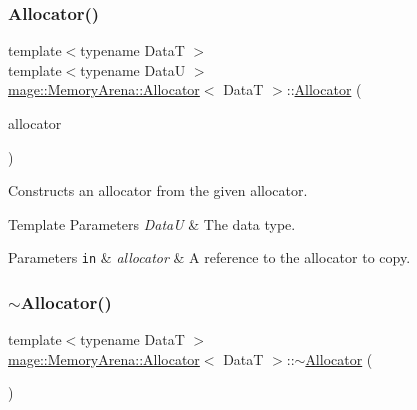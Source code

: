 \subsubsection{\texorpdfstring{Allocator()}{Allocator()}\hspace{0.1cm}{\footnotesize\ttfamily [3/4]}}
{\footnotesize\ttfamily template$<$typename DataT $>$ \\
template$<$typename DataU $>$ \\
\hyperlink{classmage_1_1_memory_arena_1_1_allocator}{mage\+::\+Memory\+Arena\+::\+Allocator}$<$ DataT $>$\+::\hyperlink{classmage_1_1_memory_arena_1_1_allocator}{Allocator} (\begin{DoxyParamCaption}\item[{const \hyperlink{classmage_1_1_memory_arena_1_1_allocator}{Allocator}$<$ DataU $>$ \&}]{allocator }\end{DoxyParamCaption})\hspace{0.3cm}{\ttfamily [noexcept]}}

Constructs an allocator from the given allocator.


\begin{DoxyTemplParams}{Template Parameters}
{\em DataU} & The data type. \\
\hline
\end{DoxyTemplParams}

\begin{DoxyParams}[1]{Parameters}
\mbox{\tt in}  & {\em allocator} & A reference to the allocator to copy. \\
\hline
\end{DoxyParams}
\hypertarget{classmage_1_1_memory_arena_1_1_allocator_a3324ead39d8cdfb8a119425879101e0a}{}\label{classmage_1_1_memory_arena_1_1_allocator_a3324ead39d8cdfb8a119425879101e0a} 
\subsubsection{\texorpdfstring{$\sim$\+Allocator()}{~Allocator()}}
{\footnotesize\ttfamily template$<$typename DataT $>$ \\
\hyperlink{classmage_1_1_memory_arena_1_1_allocator}{mage\+::\+Memory\+Arena\+::\+Allocator}$<$ DataT $>$\+::$\sim$\hyperlink{classmage_1_1_memory_arena_1_1_allocator}{Allocator} (\begin{DoxyParamCaption}{ }\end{DoxyParamCaption})\hspace{0.3cm}{\ttfamily [default]}}

